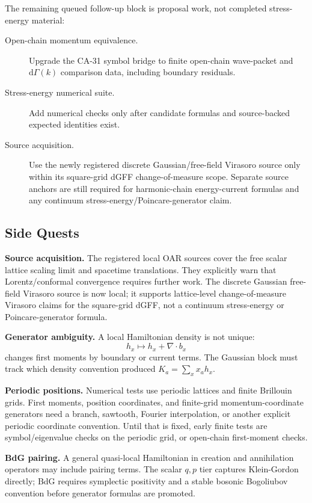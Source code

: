 The remaining queued follow-up block is proposal work, not completed
stress-energy material:
\begin{description}
\item[Open-chain momentum equivalence.]
Upgrade the CA-31 symbol bridge to finite open-chain wave-packet and
\(\mathrm{d}\Gamma(k)\) comparison data, including boundary residuals.
\item[Stress-energy numerical suite.]
Add numerical checks only after candidate formulas and source-backed expected
identities exist.
\item[Source acquisition.]
Use the newly registered discrete Gaussian/free-field Virasoro source only
within its square-grid dGFF change-of-measure scope.  Separate source anchors
are still required for harmonic-chain energy-current formulas and any continuum
stress-energy/Poincare-generator claim.
\end{description}

\subsection{Side Quests}

\textbf{Source acquisition.}  The registered local OAR sources cover the free
scalar lattice scaling limit and spacetime translations.  They explicitly warn
that Lorentz/conformal convergence requires further work.  The discrete
Gaussian free-field Virasoro source is now local; it supports lattice-level
change-of-measure Virasoro claims for the square-grid dGFF, not a continuum
stress-energy or Poincare-generator formula.

\textbf{Generator ambiguity.}  A local Hamiltonian density is not unique:
\[
  h_x\mapsto h_x+\nabla\cdot b_x
\]
changes first moments by boundary or current terms.  The Gaussian block must
track which density convention produced \(K_a=\sum_xx_ah_x\).

\textbf{Periodic positions.}  Numerical tests use periodic lattices and finite
Brillouin grids.  First moments, position coordinates, and finite-grid
momentum-coordinate generators need a branch, sawtooth, Fourier interpolation,
or another explicit periodic coordinate convention.  Until that is fixed, early
finite tests are symbol/eigenvalue checks on the periodic grid, or open-chain
first-moment checks.

\textbf{BdG pairing.}  A general quasi-local Hamiltonian in creation and
annihilation operators may include pairing terms.  The scalar \(q,p\) tier
captures Klein-Gordon directly; BdG requires symplectic positivity and a stable
bosonic Bogoliubov convention before generator formulas are promoted.

